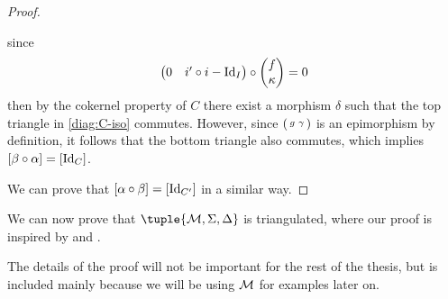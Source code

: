 \begin{proof}
\begin{diagramlabel}[\label{diag:C-iso}]
    \end{diagramlabel}
    since
    \[
        \begin{pmatrix}
            0 & i' \circ i - \operatorname{Id}_I
        \end{pmatrix}
        \circ
        \begin{pmatrix}
            f \\
            \kappa
        \end{pmatrix}
        = 0
    \]
    then by the cokernel property of \( C \) there exist a morphism \( \delta \) such that the top triangle in \autoref{diag:C-iso} commutes. However, since \( 
        \begin{psmallmatrix}
            g & \gamma
        \end{psmallmatrix}
    \) is an epimorphism by definition, it follows that the bottom triangle also commutes, which implies \( [\beta \circ \alpha] = [\operatorname{Id}_C] \).

    We can prove that \( [\alpha \circ \beta] = [\operatorname{Id}_{C'}] \) in a similar way.
\end{proof}

We can now prove that \( \tuple{\Mc, \Sigma, \Delta} \) is triangulated, where our proof is inspired by \cite[Theorem, p. 16]{Happel_1988} and \cite[Theorem 4.18]{Johan_Bachelor}.

The details of the proof will not be important for the rest of the thesis, but is included mainly because we will be using \( {\mathcal{M}} \) for examples later on.

